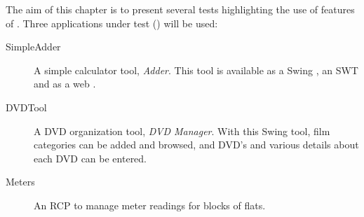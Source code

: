 
The aim of this chapter is to present several tests highlighting the use of  features of \jb{}. Three applications under test (\gdauts) will be used:


\begin{description}
\item[SimpleAdder]{ A simple calculator tool, \emph{Adder}. This tool is available as a Swing \gdaut{}, an SWT \gdaut{} and as a web \gdaut{}. }
\item [DVDTool]{A DVD organization tool, \emph{DVD Manager}. With this Swing tool, film categories can be added and browsed, and DVD's and various details about each DVD can be entered.}  
\item [Meters]{An RCP \gdaut{} to manage meter readings for blocks of flats.}
\end{description}


